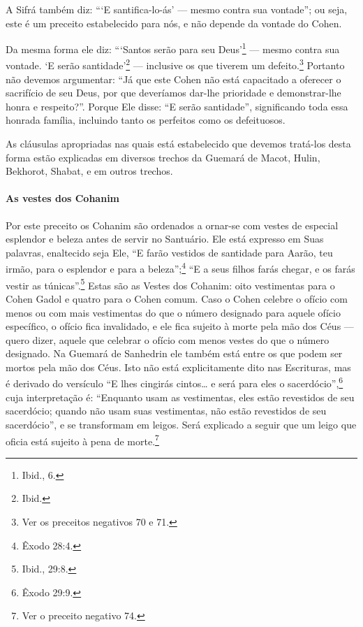 A Sifrá também diz: ```E santifica-lo-ás' --- mesmo contra sua
vontade''; ou seja, este é um preceito estabelecido para nós, e não
depende da vontade do Cohen.

Da mesma forma ele diz: ```Santos serão para seu Deus'\footnote{Ibid., 6.} ---
mesmo contra sua vontade. `E serão santidade'\footnote{Ibid.} --- inclusive os
que tiverem um defeito.\footnote{Ver os preceitos negativos 70 e 71.} Portanto não devemos argumentar:
``Já que este Cohen não está capacitado a oferecer o sacrifício de seu Deus, por que deveríamos dar-lhe prioridade e demonstrar-lhe honra e respeito?''. Porque Ele
disse: ``E serão santidade'', significando toda essa honrada família, incluindo tanto os
perfeitos como os defeituosos.

As cláusulas apropriadas nas quais está estabelecido que devemos
tratá-los desta forma estão explicadas em diversos trechos da Guemará de
Macot, Hulin, Bekhorot, Shabat, e em outros trechos.

\paragraph{As vestes dos Cohanim}


Por este preceito os Cohanim são ordenados a ornar-se com vestes de
especial esplendor e beleza antes de servir no Santuário. Ele está
expresso em Suas palavras, enaltecido seja Ele, ``E farão vestidos de
santidade para Aarão, teu irmão, para o esplendor e para a beleza'';\footnote{Êxodo 28:4.} ``E a
seus filhos farás chegar, e os farás vestir as túnicas''.\footnote{Ibid., 29:8.} Estas
são as Vestes dos Cohanim: oito vestimentas para o Cohen
Gadol e quatro para o
Cohen comum. Caso o Cohen celebre o ofício com menos ou com mais
vestimentas do que o número designado para aquele ofício específico, o
ofício fica invalidado, e ele fica sujeito à morte pela mão dos Céus ---
quero dizer, aquele que celebrar o ofício com menos vestes do que o
número designado. Na Guemará de Sanhedrin ele também está entre os que
podem ser mortos pela mão dos Céus. Isto não está explicitamente dito
nas Escrituras, mas é derivado do versículo ``E lhes cingirás cintos\ldots{}
e será para eles o sacerdócio'',\footnote{Êxodo 29:9.} cuja interpretação é:
``Enquanto usam as vestimentas, eles estão revestidos de seu sacerdócio; quando não usam suas vestimentas, não estão
revestidos de seu sacerdócio'', e se transformam em leigos. Será explicado a
seguir que um leigo que oficia está sujeito à pena de
morte.\footnote{Ver o preceito negativo 74.}

